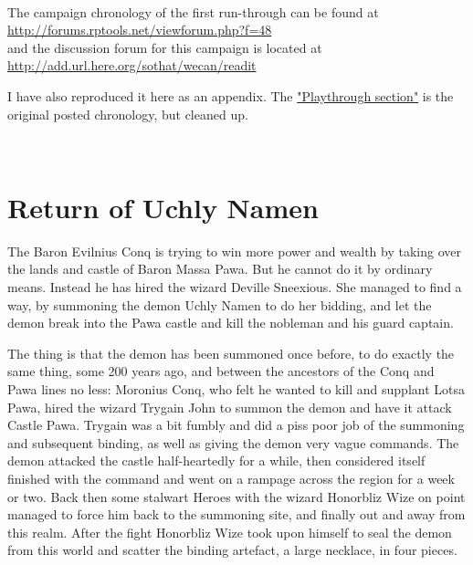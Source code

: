 \

The campaign chronology of the first run-through can be found at \\
\url{http://forums.rptools.net/viewforum.php?f=48} \\
and the discussion forum for this campaign is located at \\ \url{http://add.url.here.org/sothat/wecan/readit}

I have also reproduced it here as an appendix. The \hyperref[sec:playthrough]{"Playthrough section"} is the original posted chronology, but cleaned up.

\


%
%
%
%






\clearpage
\section*{Return of Uchly Namen}

The Baron Evilnius Conq is trying to win more power and wealth by taking over the lands and castle of Baron Massa Pawa. But he cannot do it by ordinary means. Instead he has hired the wizard Deville Sneexious.
She managed to find a way, by summoning the demon Uchly Namen to do her bidding, and let the demon break into the Pawa castle and kill the nobleman and his guard captain.

The thing is that the demon has been summoned once before, to do exactly the same thing, some 200 years ago, and between the ancestors of the Conq and Pawa lines no less: Moronius Conq, who felt he wanted to kill and supplant Lotsa Pawa, hired the wizard Trygain John to summon the demon and have it attack Castle Pawa. Trygain was a bit fumbly and did a piss poor job of the summoning and subsequent binding, as well as giving the demon very vague commands. The demon attacked the castle half-heartedly for a while, then considered itself finished with the command and went on a rampage across the region for a week or two. Back then some stalwart Heroes with the wizard Honorbliz Wize on point managed to force him back to the summoning site, and finally out and away from this realm. After the fight Honorbliz Wize took upon himself to seal the demon from this world and scatter the binding artefact, a large necklace, in four pieces.

